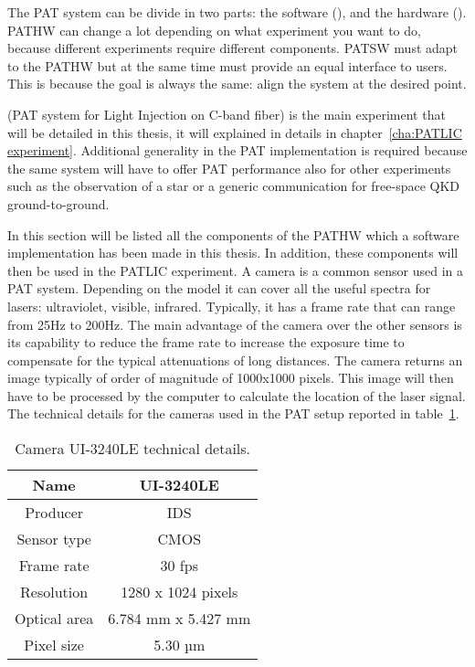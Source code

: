The PAT system can be divide in two parts: the software (), and the hardware ().
PATHW can change a lot depending on what experiment you want to do, because different experiments require different components. PATSW must adapt to the PATHW but at the same time must provide an equal interface to users. This is because the goal is always the same: align the system at the desired point.

 (PAT system for Light Injection on C-band fiber) is the main experiment that will be detailed in this thesis, it will explained in details in chapter~\ref{cha:PATLIC experiment}.
Additional generality in the PAT implementation is required because the same system will have to offer PAT performance also for other experiments such as the observation of a star or a generic communication for free-space QKD ground-to-ground.

In this section will be listed all the components of the PATHW which a software implementation has been made in this thesis. In addition, these components will then be used in the PATLIC experiment.
A camera is a common sensor used in a PAT system. Depending on the model it can cover all the useful spectra for lasers: ultraviolet, visible, infrared.
Typically, it has a frame rate that can range from 25Hz to 200Hz. The main advantage of the camera over the other sensors is its capability to reduce the frame rate to increase the exposure time to compensate for the typical attenuations of long distances.
The camera returns an image typically of order of magnitude of 1000x1000 pixels. This image will then have to be processed by the computer to calculate the location of the laser signal.
The technical details for the cameras used in the PAT setup reported in table~\ref{table:1}.

\begin{table}[h!]
      \centering
      \begin{tabular}{ |c|c| }
            \hline
            Name         & UI-3240LE           \\\hline
            Producer     & IDS                 \\\hline
            Sensor type  & CMOS                \\\hline
            Frame rate   & 30 fps              \\\hline
            Resolution   & 1280 x 1024 pixels  \\\hline
            Optical area & 6.784 mm x 5.427 mm \\\hline
            Pixel size   & 5.30 µm             \\\hline
      \end{tabular}
      \caption{Camera UI-3240LE technical details.}
      \label{table:1}
\end{table}

